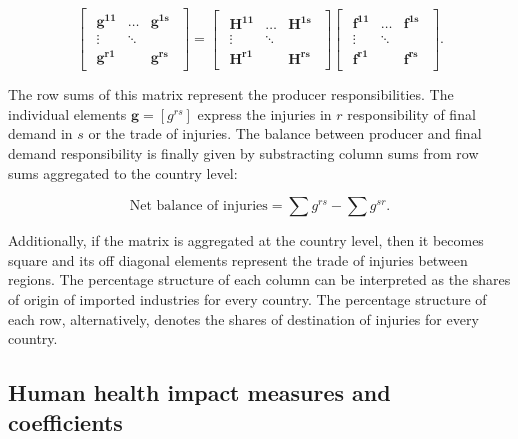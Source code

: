 \documentclass[a4paper,12pt, ]{article}
\begin{document}
\begin{equation} \begin{bmatrix} \begin{array}{ccc} \mathbf{g^{11}} & \ldots & \mathbf{g^{1s}} \\ \vdots &  \ddots &  \\
\mathbf{g^{r1}} &  & \mathbf{g^{rs}} \end{array} \end{bmatrix} = \begin{bmatrix} \begin{array}{ccc} \mathbf{H^{11}} & \ldots &
\mathbf{H^{1s}} \\ \vdots &  \ddots &  \\ \mathbf{H^{r1}} &  & \mathbf{H^{rs}} \end{array} \end{bmatrix} \begin{bmatrix}
\begin{array}{ccc} \mathbf{f^{11}} & \ldots & \mathbf{f^{1s}} \\ \vdots &  \ddots &  \\ \mathbf{f^{r1}} &  & \mathbf{f^{rs}}
\end{array} \end{bmatrix} . \label{11} \end{equation}

The row sums of this matrix represent the producer responsibilities. The individual elements $ \mathbf{g}=[g^{rs}]$ express the
injuries in $r$ responsibility of final demand in $s$ or the trade of injuries. The balance between producer and final demand
responsibility is finally given by substracting column sums from row sums aggregated to the country level:

\begin{equation} \text{Net balance of injuries} = \sum g^{rs} - \sum g^{sr}. \label{12} \end{equation}

Additionally, if the matrix is aggregated at the country level, then it becomes square and its off diagonal elements represent the trade of injuries between regions. The percentage structure of each column can be interpreted as the shares of origin of imported industries for every country. The percentage structure of each row, alternatively, denotes the shares of destination of injuries for every country.


\subsection{Human health impact measures and coefficients}
\label{sec:vars}
\end{document}
